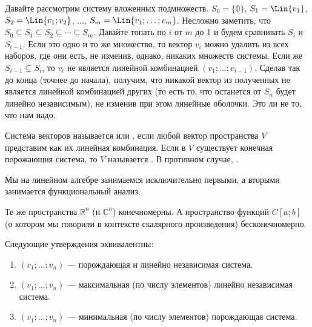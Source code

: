 \documentclass{article}
\begin{document}
\begin{itemize}
        \begin{Proof}
            Давайте рассмотрим систему вложенных подмножеств. $S_0=\{\mathbb0\}$, $S_1=\Lin\{v_1\}$, $S_2=\Lin\{v_1;v_2\}$, ..., $S_m=\Lin\{v_1;\ldots;v_m\}$. Несложно заметить, что $S_0\subseteq S_1\subseteq S_2\subseteq\cdots\subseteq S_m$. Давайте топать по $i$ от $m$ до 1 и будем сравнивать $S_i$ и $S_{i-1}$. Если это одно и то же множество, то вектор $v_i$ можно удалить из всех наборов, где они есть, не изменив, однако, никаких множеств системы. Если же $S_{i-1}\subsetneq S_i$, то $v_i$ не является линейной комбинацией $(v_1;\ldots;v_{i-1})$. Сделав так до конца (точнее до начала), получим, что никакой вектор из полученных не является линейной комбинацией других (то есть то, что останется от $S_n$ будет линейно независимым), не изменив при этом линейные оболочки. Это ли не то, что нам надо.
        \end{Proof}
        \dfn Система векторов называется  или , если любой вектор пространства $V$ представим как их линейная комбинация.
        \dfn Если в $V$ существует конечная порожающия система, то $V$ называется . В противном случае, .
        \begin{Comment}
            Мы на линейном алгебре занимаемся исключительно первыми, а вторыми занимается функциональный анализ.
        \end{Comment}
        \begin{Example}
            Те же пространства $\mathbb R^n$ (и $\mathbb C^n$) конечномерны. А пространство функций $C[a;b]$ (о котором мы говорили в контексте скалярного произведения) бесконечномерно.
        \end{Example}
        \thm Следующие утверждения эквивалентны:
        \begin{enumerate}[1.]
            \item $(v_1;\ldots;v_n)$ --- порождающая и линейно независимая система.
            \item $(v_1;\ldots;v_n)$ --- максимальная (по числу элементов) линейно независимая система.
            \item $(v_1;\ldots;v_n)$ --- минимальная (по числу элементов) порождающая система.
        \end{enumerate}
        \begin{Proof}

\end{Proof}
\end{itemize}
\end{document}

